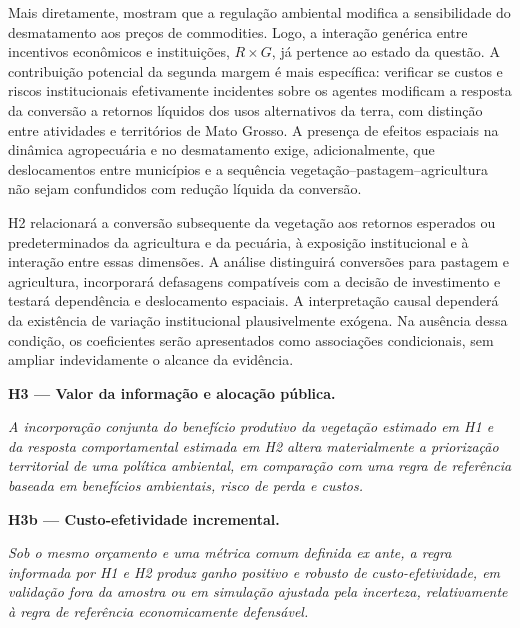 Mais diretamente, \cite{harding2021commodity} mostram que a regulação ambiental modifica a sensibilidade do desmatamento aos preços de commodities. Logo, a interação genérica entre incentivos econômicos e instituições, $R\times G$, já pertence ao estado da questão. A contribuição potencial da segunda margem é mais específica: verificar se custos e riscos institucionais efetivamente incidentes sobre os agentes modificam a resposta da conversão a retornos líquidos dos usos alternativos da terra, com distinção entre atividades e territórios de Mato Grosso. A presença de efeitos espaciais na dinâmica agropecuária e no desmatamento \cite{kuschnig2021spillovers} exige, adicionalmente, que deslocamentos entre municípios e a sequência vegetação--pastagem--agricultura não sejam confundidos com redução líquida da conversão.


H2 relacionará a conversão subsequente da vegetação aos retornos esperados ou predeterminados da agricultura e da pecuária, à exposição institucional e à interação entre essas dimensões. A análise distinguirá conversões para pastagem e agricultura, incorporará defasagens compatíveis com a decisão de investimento e testará dependência e deslocamento espaciais. A interpretação causal dependerá da existência de variação institucional plausivelmente exógena. Na ausência dessa condição, os coeficientes serão apresentados como associações condicionais, sem ampliar indevidamente o alcance da evidência.

\medskip

\noindent\textbf{H3 --- Valor da informação e alocação pública.}

\emph{A incorporação conjunta do benefício produtivo da vegetação estimado em H1 e da resposta comportamental estimada em H2 altera materialmente a priorização territorial de uma política ambiental, em comparação com uma regra de referência baseada em benefícios ambientais, risco de perda e custos.}

\medskip

\noindent\textbf{H3b --- Custo-efetividade incremental.}

\emph{Sob o mesmo orçamento e uma métrica comum definida ex ante, a regra informada por H1 e H2 produz ganho positivo e robusto de custo-efetividade, em validação fora da amostra ou em simulação ajustada pela incerteza, relativamente à regra de referência economicamente defensável.}

